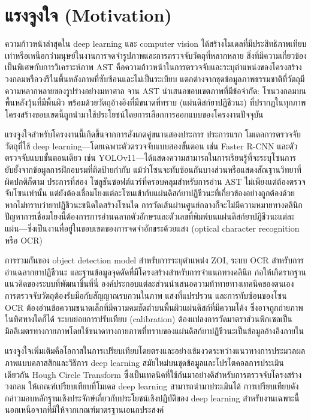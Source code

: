 \section{แรงจูงใจ (Motivation)}

ความก้าวหน้าล่าสุดใน deep learning และ computer vision ได้สร้างโมเดลที่มีประสิทธิภาพเทียบเท่าหรือเหนือกว่ามนุษย์ในงานการจดจำรูปภาพและการตรวจจับวัตถุที่หลากหลาย สิ่งที่มีความเกี่ยวข้องเป็นพิเศษกับการวิเคราะห์ภาพ AST คือความก้าวหน้าในการตรวจจับและระบุตำแหน่งของโครงสร้างวงกลมหรือวงรีในพื้นหลังภาพที่ซับซ้อนและไม่เป็นระเบียบ แตกต่างจากชุดข้อมูลภาพธรรมชาติที่วัตถุมีความหลากหลายของรูปร่างอย่างมหาศาล จาน AST นำเสนอขอบเขตภาพที่มีข้อจำกัด: โซนวงกลมบนพื้นหลังวุ้นที่มีพื้นผิว พร้อมด้วยวัตถุอ้างอิงที่มีขนาดที่ทราบ (แผ่นดิสก์ยาปฏิชีวนะ) ที่ปรากฏในทุกภาพ โครงสร้างขอบเขตนี้ถูกนำมาใช้ประโยชน์โดยการเลือกการออกแบบของโครงงานปัจจุบัน

แรงจูงใจสำหรับโครงงานนี้เกิดขึ้นจากการสังเกตคู่ขนานสองประการ ประการแรก โมเดลการตรวจจับวัตถุที่ใช้ deep learning---โดยเฉพาะตัวตรวจจับแบบสองขั้นตอน เช่น Faster R-CNN และตัวตรวจจับแบบขั้นตอนเดียว เช่น YOLOv11---ได้แสดงความสามารถในการเรียนรู้ที่จะระบุโซนการยับยั้งจากข้อมูลการฝึกอบรมที่ติดป้ายกำกับ แม้ว่าโซนจะทับซ้อนกันบางส่วนหรือแสดงสัณฐานวิทยาที่ผิดปกติก็ตาม ประการที่สอง โซลูชันซอฟต์แวร์ที่ครอบคลุมสำหรับการอ่าน AST ไม่เพียงแต่ต้องตรวจจับโซนเท่านั้น แต่ยังต้องเชื่อมโยงแต่ละโซนเข้ากับแผ่นดิสก์ยาปฏิชีวนะที่เกี่ยวข้องอย่างถูกต้องด้วย หากไม่ทราบว่ายาปฏิชีวนะชนิดใดสร้างโซนใด การวัดเส้นผ่านศูนย์กลางก็จะไม่มีความหมายทางคลินิก ปัญหาการเชื่อมโยงนี้ต้องการการอ่านฉลากตัวอักษรและตัวเลขที่พิมพ์บนแผ่นดิสก์ยาปฏิชีวนะแต่ละแผ่น---ซึ่งเป็นงานที่อยู่ในขอบเขตของการจดจำอักขระด้วยแสง (optical character recognition หรือ OCR)

การรวมกันของ object detection model สำหรับการระบุตำแหน่ง ZOI, ระบบ OCR สำหรับการอ่านฉลากยาปฏิชีวนะ และฐานข้อมูลจุดตัดที่มีโครงสร้างสำหรับการจำแนกทางคลินิก ก่อให้เกิดรากฐานแนวคิดของระบบที่พัฒนาขึ้นที่นี่ องค์ประกอบแต่ละส่วนนำเสนอความท้าทายทางเทคนิคของตนเอง การตรวจจับวัตถุต้องรับมือกับสัญญาณรบกวนในภาพ แสงที่แปรปรวน และการทับซ้อนของโซน OCR ต้องอ่านข้อความขนาดเล็กที่มีความคมชัดต่ำบนพื้นผิวแผ่นดิสก์ที่มีความโค้ง ซึ่งอาจถูกถ่ายภาพในทิศทางใดก็ได้ ระบบย่อยการปรับเทียบ (calibration) ต้องแปลงการวัดมาตราส่วนพิกเซลเป็นมิลลิเมตรทางกายภาพโดยใช้ขนาดทางกายภาพที่ทราบของแผ่นดิสก์ยาปฏิชีวนะเป็นข้อมูลอ้างอิงภายใน

แรงจูงใจเพิ่มเติมคือโอกาสในการเปรียบเทียบโดยตรงและอย่างเข้มงวดระหว่างแนวทางการประมวลผลภาพแบบคลาสสิกและวิธีการ deep learning สมัยใหม่บนชุดข้อมูลและโปรโตคอลการประเมินเดียวกัน Hough Circle Transform ซึ่งเป็นเทคนิคที่ใช้กันมาอย่างดีสำหรับการตรวจจับโครงสร้างวงกลม ให้เกณฑ์เปรียบเทียบที่โมเดล deep learning สามารถนำมาประเมินได้ การเปรียบเทียบดังกล่าวมอบหลักฐานเชิงประจักษ์เกี่ยวกับประโยชน์เชิงปฏิบัติของ deep learning สำหรับงานเฉพาะนี้ นอกเหนือจากที่มีให้จากเกณฑ์มาตรฐานเอนกประสงค์

